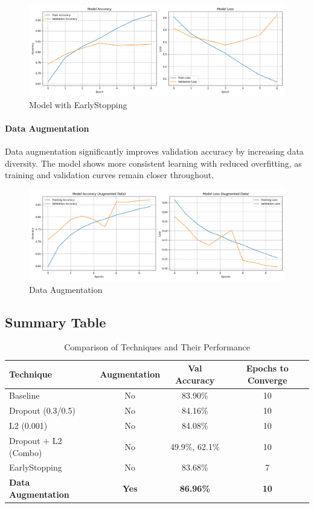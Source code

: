 \documentclass{article}
\begin{document}
\begin{figure}[H]
\centering
\includegraphics[width=0.9\linewidth]{earlystopping_accuracy_loss.png}
\caption{Model with EarlyStopping}
\end{figure}

\paragraph{Data Augmentation}
Data augmentation significantly improves validation accuracy by increasing data diversity. The model shows more consistent learning with reduced overfitting, as training and validation curves remain closer throughout.

\begin{figure}[H]
\centering
\includegraphics[width=0.9\linewidth]{augmentation_accuracy_loss.png}
\caption{Data Augmentation}
\end{figure}

\subsection*{Summary Table}

\begin{table}[H]
\centering
\begin{tabular}{|l|c|c|c|}
\hline
\textbf{Technique} & \textbf{Augmentation} & \textbf{Val Accuracy} & \textbf{Epochs to Converge} \\
\hline
Baseline & No & 83.90\% & 10 \\
Dropout (0.3/0.5) & No & 84.16\% & 10 \\
L2 (0.001) & No & 84.08\% & 10 \\
Dropout + L2 (Combo) & No & 49.9\%, 62.1\% & 10 \\
EarlyStopping & No & 83.68\% & 7 \\
\textbf{Data Augmentation} & \textbf{Yes} & \textbf{86.96\%} & \textbf{10} \\
\hline
\end{tabular}
\caption{Comparison of Techniques and Their Performance}
\end{table}
\end{document}
